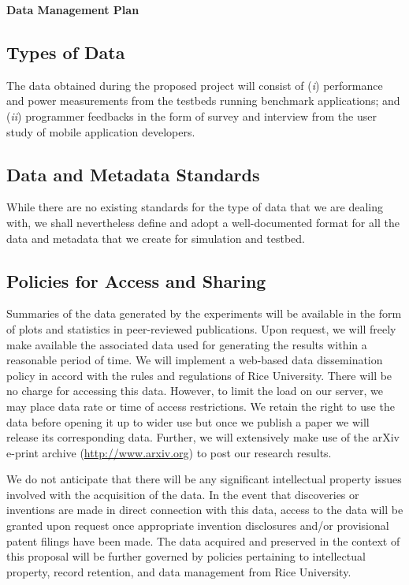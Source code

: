 \begin{center}
{\bf \large Data Management Plan}
\end{center}

\subsection*{Types of Data}
The data obtained during the proposed project will consist of (\textit{i}) performance and power measurements from the testbeds running benchmark applications; and (\textit{ii}) programmer feedbacks in the form of survey and interview from the user study of mobile application developers. 

\subsection*{Data and Metadata Standards} 
While there are no existing standards for the type of data that we are dealing with, we shall nevertheless define and adopt a well-documented format for all the data and metadata that we create for simulation and testbed.

\subsection*{Policies for Access and Sharing}
Summaries of the data generated by the experiments will be available in the form of plots and statistics in peer-reviewed publications. Upon request, we will freely make available the associated data used for generating the results within a reasonable period of time. We will implement a web-based data dissemination policy in accord with the rules and regulations of Rice University. There will be no charge for accessing this data.  However, to limit the load on our server, we may place data rate or time of access restrictions. We retain the right to use the data before opening it up to wider use but once we publish a paper we will release its corresponding data. Further, we will extensively make use of the arXiv e-print archive (\url{http://www.arxiv.org}) to post our research results. 

We do not anticipate that there will be any significant intellectual property issues involved with the acquisition of the data. In the event that discoveries or inventions are made in direct connection with this data, access to the data will be granted upon request once appropriate invention disclosures and/or provisional patent filings have been made. 
The data acquired and preserved in the context of this proposal will be further governed by policies pertaining to intellectual property, record retention, and data management from Rice University.


